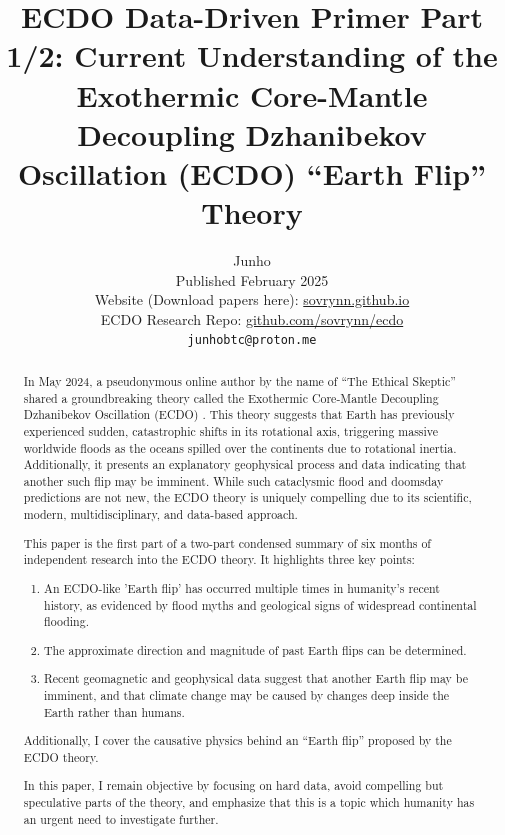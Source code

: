 \documentclass[10pt,twocolumn,letterpaper]{article}
\begin{document}
\title{ECDO Data-Driven Primer Part 1/2: Current Understanding of the Exothermic Core-Mantle Decoupling Dzhanibekov Oscillation (ECDO) “Earth Flip” Theory}

\author{Junho\\
Published February 2025\\
Website (Download papers here): \href{https://sovrynn.github.io}{sovrynn.github.io}\\
ECDO Research Repo: \href{https://github.com/sovrynn/ecdo}{github.com/sovrynn/ecdo}\\
{\tt\small junhobtc@proton.me}
}

\maketitle

\begin{abstract}
In May 2024, a pseudonymous online author by the name of “The Ethical Skeptic” \cite{0} shared a groundbreaking theory called the Exothermic Core-Mantle Decoupling Dzhanibekov Oscillation (ECDO) \cite{1}. This theory suggests that Earth has previously experienced sudden, catastrophic shifts in its rotational axis, triggering massive worldwide floods as the oceans spilled over the continents due to rotational inertia. Additionally, it presents an explanatory geophysical process and data indicating that another such flip may be imminent. While such cataclysmic flood and doomsday predictions are not new, the ECDO theory is uniquely compelling due to its scientific, modern, multidisciplinary, and data-based approach.

This paper is the first part of a two-part condensed summary of six months of independent research \cite{2,20} into the ECDO theory. It highlights three key points:

\begin{flushleft}
\begin{enumerate}
    \item An ECDO-like 'Earth flip' has occurred multiple times in humanity’s recent history, as evidenced by flood myths and geological signs of widespread continental flooding.
    \item The approximate direction and magnitude of past Earth flips can be determined.
    \item Recent geomagnetic and geophysical data suggest that another Earth flip may be imminent, and that climate change may be caused by changes deep inside the Earth rather than humans.
\end{enumerate}
\end{flushleft}

Additionally, I cover the causative physics behind an “Earth flip” proposed by the ECDO theory.

In this paper, I remain objective by focusing on hard data, avoid compelling but speculative parts of the theory, and emphasize that this is a topic which humanity has an urgent need to investigate further.
\end{abstract}
\end{document}

